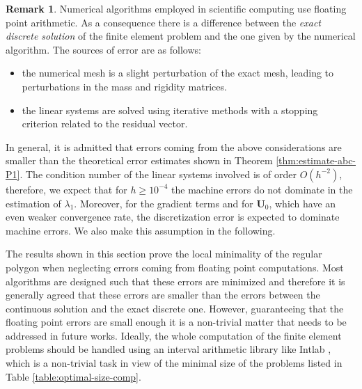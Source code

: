\documentclass[11pt]{article}
\numberwithin{equation}{section}\newtheorem*{jepEnonce}{\jepEnonceTitle}\newenvironment{enonce*}[1]{\def\jepEnonceTitle{#1}\jepEnonce}{\endjepEnonce}\newtheorem*{conj*}{Conjecture}
\theoremstyle{plain}
\theoremstyle{definition}
\newtheorem{rem}[thm]{Remark}
\newcommand{\bo}[1]{{\boldsymbol#1}}
\begin{document}
\begin{rem}
Numerical algorithms employed in scientific computing use floating point arithmetic. As a consequence there is a difference between the \emph{exact discrete solution} of the finite element problem and the one given by the numerical algorithm. The sources of error are as follows:
\begin{itemize}
\item the numerical mesh is a slight perturbation of the exact mesh, leading to perturbations in the mass and rigidity matrices.
\item the linear systems are solved using iterative methods with a stopping criterion related to the residual vector.
\end{itemize}
In general, it is admitted that errors coming from the above considerations are smaller than the theoretical error estimates shown in Theorem \ref{thm:estimate-abc-P1}. The condition number of the linear systems involved is of order $O(h^{-2})$, therefore, we expect that for $h\geq 10^{-4}$ the machine errors do not dominate in the estimation of $\lambda_1$. Moreover, for the gradient terms and for $\bo U_0$, which have an even weaker convergence rate, the discretization error is expected to dominate machine errors. We also make this assumption in the following.

The results shown in this section prove the local minimality of the regular polygon when neglecting errors coming from floating point computations. Most algorithms are designed such that these errors are minimized and therefore it is generally agreed that these errors are smaller than the errors between the continuous solution and the exact discrete one. However, guaranteeing that the floating point errors are small enough it is a non-trivial matter that needs to be addressed in future works. Ideally, the whole computation of the finite element problems should be handled using an interval arithmetic library like Intlab \cite{intlab}, which is a non-trivial task in view of the minimal size of the problems listed in Table \ref{table:optimal-size-comp}.
\end{rem}
\end{document}
